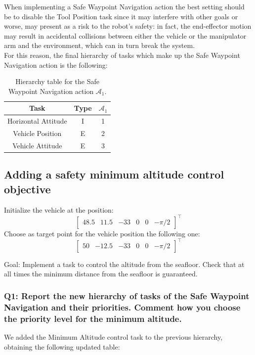 \documentclass{article}
\begin{document}
When implementing a Safe Waypoint Navigation action the best setting should be to disable the Tool Position task since it may interfere with other goals or worse, may present as a risk to the robot's safety: in fact, the end-effector motion may result in accidental collisions between either the vehicle or the manipulator arm and the environment, which can in turn break the system. \\
For this reason, the final hierarchy of tasks which make up the Safe Waypoint Navigation action is the following:
\begin{table}[htb]
	\caption{Hierarchy table for the Safe Waypoint Navigation action $\mathcal{A}_{1}$.}
	\label{tb1:ex1.1.4SafeWaypointNavigationTable}
	\begin{center}
		\footnotesize
		\begin{tabular}{ccc}
			\toprule
			Task & Type & $\mathcal{A}_{1}$ \\
			\midrule
			Horizontal Attitude & I & 1 \\
			\hdashline
			Vehicle Position    & E & 2 \\
			\hdashline
			Vehicle Attitude    & E & 3 \\
			\bottomrule
		\end{tabular}
	\end{center}
\end{table}

\subsection{Adding a safety minimum altitude control objective}
Initialize the vehicle at the position:
\begin{displaymath}
\begin{bmatrix} 48.5 & 11.5 & -33 & 0 & 0 &-\pi/2\end{bmatrix}^\top
\end{displaymath}
Choose as target point for the vehicle position the following one:
\begin{displaymath}
\begin{bmatrix} 50 & -12.5 & -33 & 0 & 0 & -\pi/2 \end{bmatrix}^\top
\end{displaymath}

Goal: Implement a task to control the altitude from the seafloor. Check that at all times the minimum distance from the seafloor is guaranteed.


\subsubsection{Q1: Report the new hierarchy of tasks of the Safe Waypoint Navigation and their priorities. Comment how you choose the priority level for the minimum altitude.}
We added the Minimum Altitude control task to the previous hierarchy, obtaining the following updated table:
\end{document}
